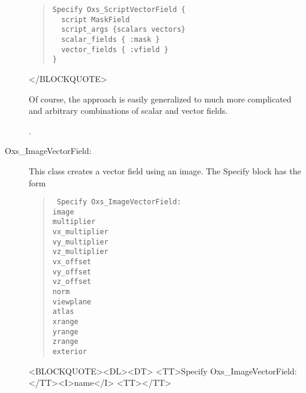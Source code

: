 \begin{description}
\begin{quote}
\begin{verbatim}
Specify Oxs_ScriptVectorField {
  script MaskField
  script_args {scalars vectors}
  scalar_fields { :mask }
  vector_fields { :vfield }
}
\end{verbatim}
\end{quote}
\begin{rawhtml}
</BLOCKQUOTE>
\end{rawhtml}
Of course, the  approach is easily
generalized to much more complicated and arbitrary combinations of
scalar and vector fields.

\begin{ExampleMifs}[Example]
  .
\end{ExampleMifs}

\item[Oxs\_ImageVectorField:\label{item:ImageVectorField}]
%
This class creates a vector field using an image.  The Specify block has
the form
\begin{latexonly}
\begin{quote}\tt
Specify Oxs\_ImageVectorField: \ocb\\
 \bi image \\
 \bi multiplier \\
 \bi vx\_multiplier \\
 \bi vy\_multiplier \\
 \bi vz\_multiplier \\
 \bi vx\_offset \\
 \bi vy\_offset \\
 \bi vz\_offset \\
 \bi norm \\
 \bi viewplane \\
 \bi atlas \\
 \bi xrange \ocb{}\ccb\\
 \bi yrange \ocb{}\ccb\\
 \bi zrange \ocb{}\ccb\\
 \bi exterior \\
\ccb
\end{quote}
\end{latexonly}
\begin{rawhtml}
<BLOCKQUOTE><DL><DT>
<TT>Specify Oxs_ImageVectorField:</TT><I>name</I> <TT>{</TT>
}
\end{rawhtml}
\end{description}
